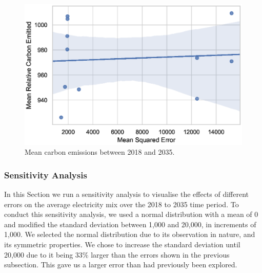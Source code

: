 \documentclass[final,3p,times,twocolumn,numbers]{elsarticle}
\begin{document}
\begin{figure}
\centering
\includegraphics[width=0.8\columnwidth]{figures/results/elecsim_results/results_2/Carbon_emitted_mean_output.eps}
\caption{Mean carbon emissions between 2018 and 2035.}
\label{fig:Carbon_emitted_mean_output}
\end{figure}





%
%
%
%
%




\subsubsection{Sensitivity Analysis}

In this Section we run a sensitivity analysis to visualise the effects of different errors on the average electricity mix over the 2018 to 2035 time period. To conduct this sensitivity analysis, we used a normal distribution with a mean of 0 and modified the standard deviation between 1,000 and 20,000, in increments of 1,000. We selected the normal distribution due to its observation in nature, and its symmetric properties. We chose to increase the standard deviation until 20,000 due to it being 33\% larger than the errors shown in the previous subsection. This gave us a larger error than had previously been explored.
\end{document}

